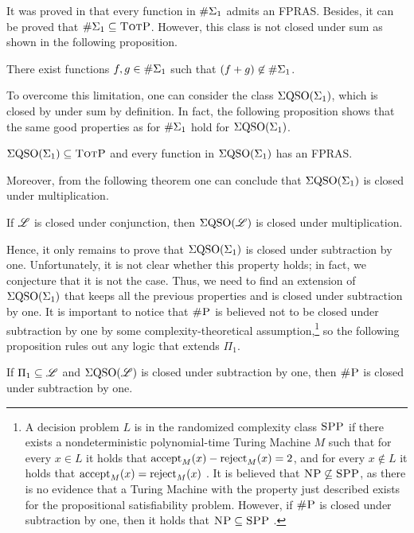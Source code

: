 It was proved in \cite{SalujaST95} that every function in $\#\Sigma_{1}$ admits an FPRAS. Besides, it can be proved that $\#\Sigma_{1} \subseteq \text{\sc TotP}$. However, this class is not closed under sum as shown in the following proposition.
\begin{proposition}\label{prop-e1-nc}
There exist functions $f, g \in \#\Sigma_{1}$ such that $(f + g) \not\in \#\Sigma_{1}$.
\end{proposition}
To overcome this limitation, one can consider the class $\Sigma{\rm QSO}(\Sigma_{1})$, which is closed by under sum by definition. In fact, the following proposition shows that the same good properties as for $\#\Sigma_{1}$ hold for $\Sigma{\rm QSO}(\Sigma_{1})$.
\begin{proposition} \label{prop:qe0-fp-qe1-totp-fptras}
$\Sigma{\rm QSO}(\Sigma_{1}) \subseteq \text{\sc TotP}$ and every function in $\Sigma{\rm QSO}(\Sigma_{1})$ has an FPRAS.
\end{proposition}
Moreover, from the following theorem one can conclude that $\Sigma{\rm QSO}(\Sigma_{1})$ is closed under multiplication.
\begin{theorem}\label{theo:binary-prod}
	If $\mathscr{L}$ is closed under conjunction, then $\Sigma{\rm QSO}(\mathscr{L})$ is closed under multiplication.
\end{theorem}
Hence, it only remains to prove that $\Sigma{\rm QSO}(\Sigma_{1})$ is closed under subtraction by one. Unfortunately, it is not clear whether this property holds; in fact, we conjecture that it is not the case. Thus, we need to find an extension of $\Sigma{\rm QSO}(\Sigma_{1})$ that keeps all the previous properties and is closed under subtraction by one. It is important to notice that $\text{\sc \#P}$ is believed not to be closed under subtraction by one by some complexity-theoretical assumption,\footnote{A decision problem $L$ is in the randomized complexity class $\text{\sc SPP}$ if there exists a nondeterministic polynomial-time Turing Machine $M$ such that for every $x \in L$ it holds that $\text{\rm accept}_M(x) - \text{\rm reject}_M(x) = 2$, and for every $x \not\in L$ it holds that $\text{\rm accept}_M(x) = \text{\rm reject}_M(x)$ \cite{OH93,FFK94}. It is believed that $\text{\sc NP} \not\subseteq \text{\sc SPP}$, as there is no evidence that a Turing Machine with the property just described exists for the propositional satisfiability problem. However, if $\text{\sc \#P}$ is closed under subtraction by one, then it holds that $\text{\sc NP} \subseteq \text{\sc SPP}$ \cite{OH93}.} so the following proposition rules out any logic that extends $\Pi_1$.
\begin{proposition} \label{pi-minusone}
If $\Pi_1 \subseteq \mathscr{L}$ and $\Sigma{\rm QSO}(\mathscr{L})$ is closed under subtraction by one, then $\text{\sc \#P}$ is closed under subtraction by one. 
\end{proposition}
